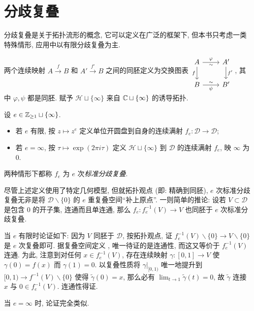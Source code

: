\section{分歧复叠}\label{sec:branched-covering}
分歧复叠是关于拓扑流形的概念, 它可以定义在广泛的框架下, 但本书只考虑一类特殊情形, 应用中以有限分歧复叠为主.

两个连续映射 $A \xrightarrow{f} B$ 和 $A' \xrightarrow{f'} B$ 之间的同胚定义为交换图表
$\begin{tikzcd}
	A \arrow[d, "f"'] \arrow[r, "\varphi", "\sim"'] & A' \arrow[d, "{f'}"] \\
	B \arrow[r, "\psi"', "\sim"] & B'
\end{tikzcd}$,
其中 $\varphi, \psi$ 都是同胚. 赋予 $\mathcal{H} \sqcup \{\infty\}$ 来自 $\mathbb{C} \sqcup \{\infty\}$ 的诱导拓扑.

\begin{definition}
	设 $e \in \mathbb{Z}_{\geq 1} \sqcup \{\infty\}$.
	\begin{itemize}
		\item 若 $e$ 有限, 按 $z \mapsto z^e$ 定义单位开圆盘到自身的连续满射 $f_e: \mathcal{D} \to \mathcal{D}$;
		\item 若 $e = \infty$, 按 $\tau \mapsto \exp(2\pi i\tau)$ 定义 $\mathcal{H} \sqcup \{\infty\}$ 到 $\mathcal{D}$ 的连续满射 $f_e$, 映 $\infty$ 为 $0$.
	\end{itemize}	
	两种情形下都称 $f_e$ 为 $e$ 次\emph{标准分歧复叠}.
\end{definition}

\begin{remark}\label{rem:branched-restriction}
	尽管上述定义使用了特定几何模型, 但就拓扑观点 (即: 精确到同胚), $e$ 次标准分歧复叠无非是将 $\mathcal{D} \smallsetminus \{0\}$ 的 $e$ 重复叠空间``补上原点''. 一则简单的推论: 设若 $V \subset \mathcal{D}$ 是包含 $0$ 的开子集, 连通而且单连通, 那么 $f_e: f_e^{-1}(V) \to V$ 也同胚于 $e$ 次标准分歧复叠.
	
	当 $e$ 有限时论证如下: 因为 $V$ 同胚于 $\mathcal{D}$, 按拓扑观点, 证 $f_e^{-1}(V) \smallsetminus \{0\} \to V \smallsetminus \{0\}$ 是 $e$ 次复叠即可. 据复叠空间定义 \cite[第五章 \S 1]{You}, 唯一待证的是连通性, 而这又等价于 $f_e^{-1}(V)$ 连通. 为此, 注意到对任何 $x \in f_e^{-1}(V)$, 存在连续映射 $\gamma: [0,1] \to V$ 使 $\gamma(0) = f(x)$ 而 $\gamma(1) = 0$. 以复叠性质将 $\gamma|_{[0,1)}$ 唯一地提升到 $[0,1) \to f^{-1}(V) \smallsetminus \{0\}$ 使得 $\tilde{\gamma}(0)=x$, 那么必有 $\lim_{t \to 1} \tilde{\gamma}(t) = 0$, 故 $\tilde{\gamma}$ 连接 $x$ 与 $0 \in f_e^{-1}(V)$. 连通性得证.
	
	当 $e=\infty$ 时, 论证完全类似.
\end{remark}

